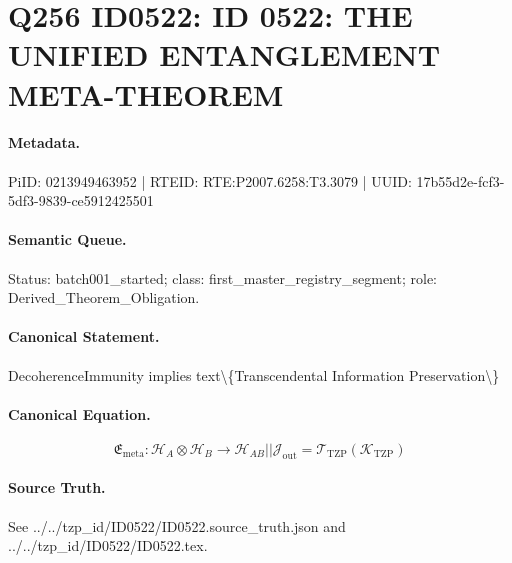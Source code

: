 \section*{Q256 ID0522: ID 0522: THE UNIFIED ENTANGLEMENT META-THEOREM}
\paragraph{Metadata.}
PiID: 0213949463952 | RTEID: RTE:P2007.6258:T3.3079 | UUID: 17b55d2e-fcf3-5df3-9839-ce5912425501

\paragraph{Semantic Queue.}
Status: batch001\_started; class: first\_master\_registry\_segment; role: Derived\_Theorem\_Obligation.

\paragraph{Canonical Statement.}
DecoherenceImmunity implies text\textbackslash{}\{Transcendental Information Preservation\textbackslash{}\}

\paragraph{Canonical Equation.}
\[
\mathfrak{E}_{\mathrm{meta}}:\mathcal{H}_A\otimes\mathcal{H}_B\longrightarrow \mathcal{H}_{AB} || \mathcal{J}_{\mathrm{out}}=\mathcal{T}_{\mathrm{TZP}}\!\left(\mathcal{K}_{\mathrm{TZP}}\right)
\]

\paragraph{Source Truth.}
See ../../tzp\_id/ID0522/ID0522.source\_truth.json and ../../tzp\_id/ID0522/ID0522.tex.
